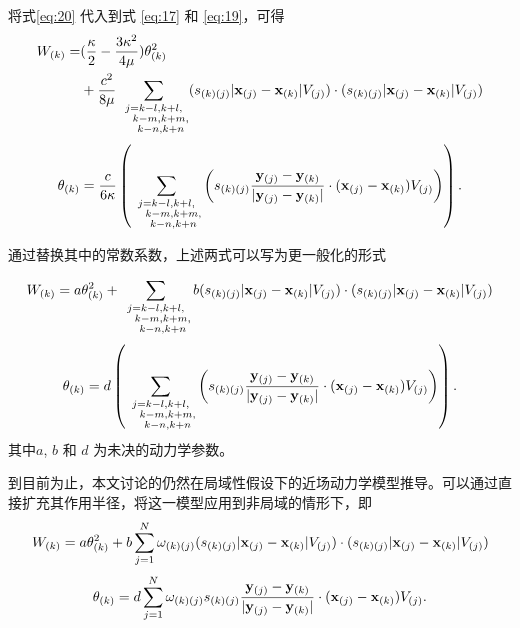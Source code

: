 {{将式\ref{eq:20} 代入到式 \ref{eq:17} 和 \ref{eq:19}，可得
\begin{equation}
\begin{aligned}
W_{(k)} =& (\frac{\kappa}{2} -\frac{3\kappa^2}{4\mu})\theta_{(k)}^2 \\
         &+\frac{c^2}{8\mu}\sum_{\substack {j=k-l,k+l,\\ \quad k-m,k+m,\\ \quad k-n,k+n}}(s_{(k)(j)}|\mathbf{x}_{(j)}-\mathbf{x}_{(k)}|V_{(j)})\cdot(s_{(k)(j)}|\mathbf{x}_{(j)}-\mathbf{x}_{(k)}|V_{(j)})
\end{aligned}
\label{eq:22}
\end{equation}
\begin{equation}
\theta_{(k)} = \frac{c}{6\kappa}\left(\sum_{\substack {j=k-l,k+l,\\ \quad k-m,k+m,\\ \quad k-n,k+n}}\left(s_{(k)(j)}\frac{\mathbf{y}_{(j)} - \mathbf{y}_{(k)}}{|\mathbf{y}_{(j)} - \mathbf{y}_{(k)}|}\cdot(\mathbf{x}_{(j)}-\mathbf{x}_{(k)})V_{(j)}\right)\right).
\label{eq:23}
\end{equation}

通过替换其中的常数系数，上述两式可以写为更一般化的形式

\begin{equation}
W_{(k)} = a\theta_{(k)}^2 + \sum_{\substack {j=k-l,k+l,\\ \quad k-m,k+m,\\ \quad k-n,k+n}}b(s_{(k)(j)}|\mathbf{x}_{(j)}-\mathbf{x}_{(k)}|V_{(j)})\cdot(s_{(k)(j)}|\mathbf{x}_{(j)}-\mathbf{x}_{(k)}|V_{(j)})
\label{eq:24}
\end{equation}
\begin{equation}
\theta_{(k)} = d\left(\sum_{\substack {j=k-l,k+l,\\ \quad k-m,k+m,\\ \quad k-n,k+n}}\left(s_{(k)(j)}\frac{\mathbf{y}_{(j)} - \mathbf{y}_{(k)}}{|\mathbf{y}_{(j)} - \mathbf{y}_{(k)}|}\cdot(\mathbf{x}_{(j)}-\mathbf{x}_{(k)})V_{(j)}\right)\right).
\label{eq:25}
\end{equation}
其中$a$, $b$ 和 $d$ 为未决的动力学参数。

到目前为止，本文讨论的仍然在局域性假设下的近场动力学模型推导。可以通过直接扩充其作用半径，将这一模型应用到非局域的情形下，即
\begin{equation}
W_{(k)} = a\theta_{(k)}^2 + b\sum_{j=1}^{N}\omega_{(k)(j)}(s_{(k)(j)}|\mathbf{x}_{(j)}-\mathbf{x}_{(k)}|V_{(j)})\cdot(s_{(k)(j)}|\mathbf{x}_{(j)}-\mathbf{x}_{(k)}|V_{(j)})
\label{eq:26}
\end{equation}
\begin{equation}
\theta_{(k)} = d\sum_{j=1}^{N}\omega_{(k)(j)}s_{(k)(j)}\frac{\mathbf{y}_{(j)} - \mathbf{y}_{(k)}}{|\mathbf{y}_{(j)} - \mathbf{y}_{(k)}|}\cdot(\mathbf{x}_{(j)}-\mathbf{x}_{(k)})V_{(j)}.
\label{eq:27}
\end{equation}

}}
